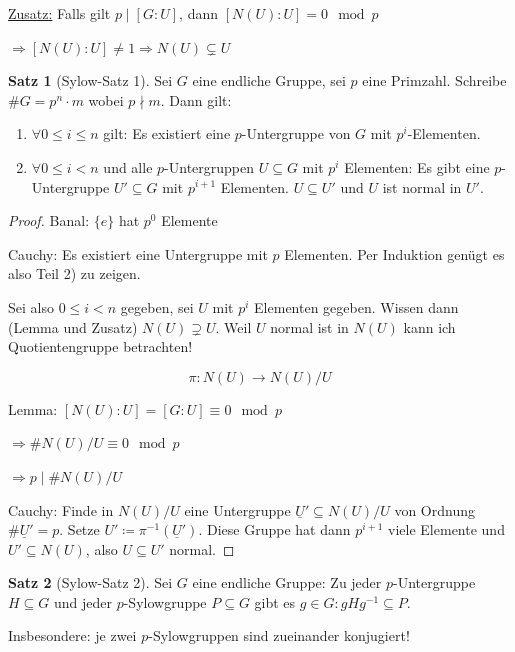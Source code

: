 \documentclass[12pt,parskip=full]{scrartcl}
\newcommand{\heading}{\underline}
\theoremstyle{definition}
\newtheorem{theorem}{Satz}[section]
\theoremstyle{remark}
\begin{document}
	\heading{Zusatz:} Falls gilt $p \mid [G:U]$, dann $[N(U):U] = 0 \mod p$
	
	$\Rightarrow [N(U):U] \neq 1 \Rightarrow N(U) \subsetneq U$
	
	\begin{theorem}[Sylow-Satz 1]
		Sei $G$ eine endliche Gruppe, sei $p$ eine Primzahl. Schreibe $\#G = p^n \cdot m$ wobei $p \nmid m$. Dann gilt:
		\begin{enumerate}
			\item $\forall 0 \leq i \leq n$ gilt: Es existiert eine $p$-Untergruppe von $G$ mit $p^i$-Elementen.
			\item $\forall 0 \leq i < n$ und alle $p$-Untergruppen $U \subseteq G$ mit $p^i$ Elementen: Es gibt eine $p$-Untergruppe $U' \subseteq G$ mit $p^{i+1}$ Elementen. $U \subseteq U'$ und $U$ ist normal in $U'$.
		\end{enumerate}
	\end{theorem}

	\begin{proof}
		Banal: $\{ e \}$ hat $p^0$ Elemente
		
		Cauchy: Es existiert eine Untergruppe mit $p$ Elementen. Per Induktion genügt es also Teil 2) zu zeigen.
		
		Sei also $0 \leq i < n$ gegeben, sei $U$ mit $p^i$ Elementen gegeben. Wissen dann (Lemma und Zusatz) $N(U) \supsetneq U$. Weil $U$ normal ist in $N(U)$ kann ich Quotientengruppe betrachten!
		
		\begin{equation*}
			\pi: N(U) \longrightarrow N(U) / U
		\end{equation*}
		
		Lemma: $[N(U):U] = [G: U] \equiv 0 \mod p$
		
		$\Rightarrow \# N(U)/U \equiv 0 \mod p$
		
		$\Rightarrow p \mid \# N(U)/U$
		
		Cauchy: Finde in $N(U)/U$ eine Untergruppe $\underline{U}' \subseteq N(U)/U$ von Ordnung $\#\underline{U}' = p$. Setze $U' \coloneqq \pi^{-1} (\underline{U}')$. Diese Gruppe hat dann $p^{i+1}$ viele Elemente und $U' \subseteq N(U)$, also $U \subseteq U'$ normal.
	\end{proof}

	\begin{theorem}[Sylow-Satz 2]
		Sei $G$ eine endliche Gruppe: Zu jeder $p$-Untergruppe $H \subseteq G$ und jeder $p$-Sylowgruppe $P \subseteq G$ gibt es $g \in G: g H g^{-1} \subseteq P$.
		
		Insbesondere: je zwei $p$-Sylowgruppen sind zueinander konjugiert!
	\end{theorem}
\end{document}
